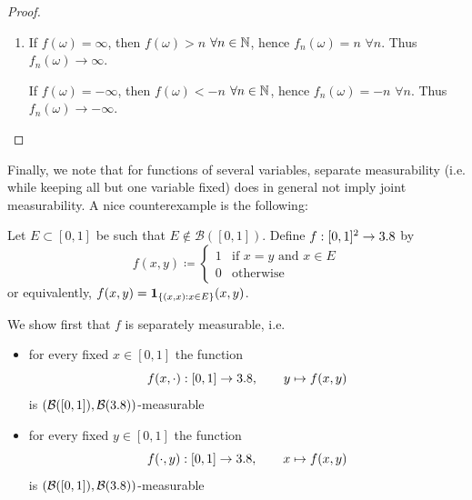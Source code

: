 \begin{proof}
\begin{enumerate}[label=(\alph*)]
\item
If $f(\omega) = \infty$, then $f(\omega) > n$ $\forall n \in \mathbb{N}$, hence
\(
f_n(\omega) = n
\)
$\forall n$.
Thus $f_n(\omega) \to \infty$.

If $f(\omega) = -\infty$, then $f(\omega) < -n$ $\forall n \in \mathbb{N}$, hence
\(
f_n(\omega) = -n
\)
$\forall n$.
Thus $f_n(\omega) \to -\infty$.
\qedhere
\end{enumerate}
\end{proof}


Finally, we note that for functions of several variables, separate measurability (i.e. while keeping all but one variable fixed) does in general not imply joint measurability.
A nice counterexample is the following:

\begin{example}
\label{ex:separately-measurable-not-jointly-measurable}
Let $E \subset [0,1]$ be such that $E \notin \mathcal{B}([0,1])$.
Define $f : [0,1]^2 \to 3.8$ by
\[
f(x,y)
\coloneq
\begin{cases}
1 & \text{if } x=y \text{ and } x \in E \\
0 & \text{otherwise}
\end{cases}
\]
or equivalently,
\(
f(x,y)
=
\mathbf{1}_{\{(x,x):x\in E\}}(x,y)
\).

We show first that $f$ is separately measurable,
i.e. 
\begin{itemize}
\item
for every fixed $x \in [0,1]$ the function
\[
f(x,\cdot) : [0,1] \to 3.8,
\qquad
y \mapsto f(x,y)
\]
is $(\mathcal{B}([0,1]),\mathcal{B}(3.8))$-measurable
\item
for every fixed $y \in [0,1]$ the function
\[
f(\cdot,y) : [0,1] \to 3.8,
\qquad
x \mapsto f(x,y)
\]
is $(\mathcal{B}([0,1]),\mathcal{B}(3.8))$-measurable
\end{itemize}



\end{example}
